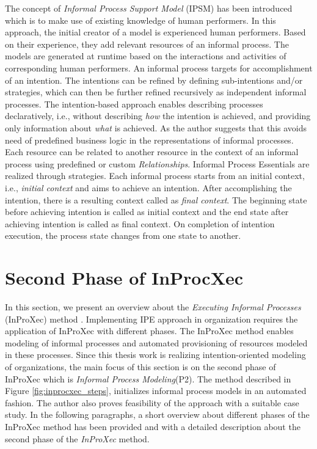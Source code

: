 The concept of \textit{Informal Process Support Model} (IPSM) \cite{Sungur2014a} has been introduced which is to make use of existing knowledge of human performers. In this approach, the initial creator of a model is experienced human performers. Based on their experience, they add relevant  resources of an informal process. The models are generated at runtime based on the interactions and activities of corresponding human performers. An informal process targets for accomplishment of an intention. The intentions can be refined by defining sub-intentions and/or strategies, which can then be further refined recursively as independent informal processes. The intention-based approach enables describing processes declaratively, i.e., without describing \textit{how} the intention is achieved, and providing only information about \textit{what} is achieved. As the author \cite{Sungur2014a} suggests that this avoids need of predefined business logic in the representations of informal processes. Each resource can be related to another resource in the context of an informal process using predefined or custom \textit{Relationships}. Informal Process Essentials are realized through strategies. Each informal process starts from an initial context, i.e., \textit{initial context} and aims to achieve an intention. After accomplishing the intention, there is a resulting context called as \textit{final context}. The beginning state before achieving intention is called as initial context and the end state after achieving intention is called as final context. On completion of intention execution, the process state changes from one state to another.

\section{Second Phase of InProcXec}
\label{sec:inproxec}
In this section, we present an overview about the \textit{Executing Informal Processes} (InProXec) method \cite{Sungur2015}. Implementing IPE approach in organization requires the application of InProXec with different phases. The InProXec method enables modeling of informal processes and automated provisioning of resources modeled in these processes. Since this thesis work is realizing intention-oriented modeling of organizations, the main focus of this section is on the second phase of InProXec which is \textit{Informal Process Modeling}(P2). The method described in Figure \ref{fig:inprocxec_steps}, initializes informal process models in an automated fashion. The author also proves feasibility of the approach with a suitable case study.  In the following paragraphs, a short overview about different phases of the InProXec method has been provided and with a detailed description about the second phase of the \textit{InProXec} method. 

